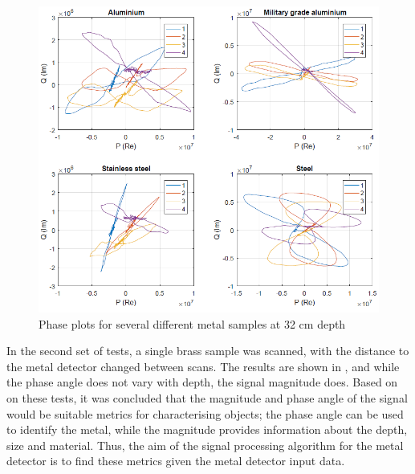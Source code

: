 \documentclass[main.tex]{subfiles}
\begin{document}
\begin{figure}[ht]
\includegraphics[width=\textwidth]{3-ConceptDesign/metals.PNG}
\centering
\caption{Phase plots for several different metal samples at 32 cm depth} 
\end{figure}

In the second set of tests, a single brass sample was scanned, with the distance to the metal detector changed between scans. The results are shown in , and while the phase angle does not vary with depth, the signal magnitude does. Based on on these tests,   it was concluded that the magnitude and phase angle of the signal would be suitable metrics for characterising objects; the phase angle can be used to identify the metal, while the magnitude provides information about the depth, size and material. Thus, the aim of the signal processing algorithm for the metal detector is to find these metrics given the metal detector input data. 
\end{document}
